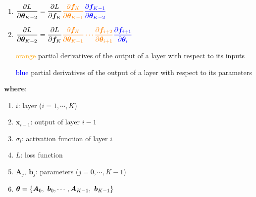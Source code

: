 \begin{enumerate}
\begin{multicols}{2}
\begin{enumerate}[resume*=grad-dnn]
        \item 
        $
            \dfrac{\partial L}{\partial \bm{\theta}_{K-2}}
            = \dfrac{\partial L}{\partial \bm{f}_K} 
            \textcolor{orange}{\dfrac{\partial \bm{f}_K}{\partial \bm{\theta}_{K-1}}}
            \textcolor{blue}{\dfrac{\partial \bm{f}_{K-1}}{\partial \bm{\theta}_{K-2}}}
        $
        \hfill \cite{mfml/book/mml/Deisenroth-Faisal-Ong}

        \item 
        $
            \dfrac{\partial L}{\partial \bm{\theta}_{K-2}}
            = \dfrac{\partial L}{\partial \bm{f}_K} 
            \textcolor{orange}{
                \dfrac{\partial \bm{f}_K}{\partial \bm{\theta}_{K-1}} 
                \cdots
                \dfrac{\partial \bm{f}_{i+2}}{\partial \bm{\theta}_{i+1}} 
            }
            \textcolor{blue}{\dfrac{\partial \bm{f}_{i+1}}{\partial \bm{\theta}_{i}}}
        $
        \hfill \cite{mfml/book/mml/Deisenroth-Faisal-Ong}
    \end{enumerate}
    \end{multicols}
    \begin{enumerate}
        \item [\textcolor{orange}{orange}] partial derivatives of the output of a layer with respect to its inputs

        \item [\textcolor{blue}{blue}] partial derivatives of the output of a layer with respect to its parameters
    \end{enumerate}
    \vspace{0.5cm}
    \textbf{where}:
    \begin{multicols}{2}
    \begin{enumerate}
        \item $i$: layer ($i = 1,\cdots,K$)
        \hfill \cite{mfml/book/mml/Deisenroth-Faisal-Ong}
        
        \item $\bm{x}_{i-1}$: output of layer $i - 1$
        \hfill \cite{mfml/book/mml/Deisenroth-Faisal-Ong}
        
        \item $\sigma_i$: activation function of layer $i$
        \hfill \cite{mfml/book/mml/Deisenroth-Faisal-Ong}

        \item $L$: loss function
        \hfill \cite{mfml/book/mml/Deisenroth-Faisal-Ong}

        \item $\bm{A}_{j},\ \bm{b}_{j}$: parameters ($j = 0,\cdots,K-1$)
        \hfill \cite{mfml/book/mml/Deisenroth-Faisal-Ong}

        \item $\bm{\theta} = \dCurlyBrac{\bm{A}_{0},\ \bm{b}_{0}, \cdots, \bm{A}_{K-1},\ \bm{b}_{K-1}}$
        \hfill \cite{mfml/book/mml/Deisenroth-Faisal-Ong}
    \end{enumerate}
    \end{multicols}

\end{enumerate}
